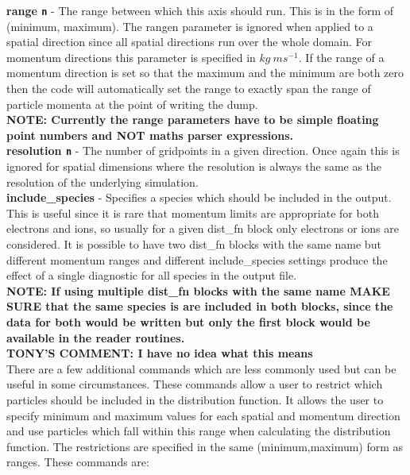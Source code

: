 \documentclass[12pt,a4paper]{article}
\newcommand{\emphtext}{\color{warwickdark} \fontfamily{phv}\selectfont\large\bf}
\newcommand{\inlinecode}[1]{{\color{warwickred} \bf\texttt{#1}}}
\newcommand{\tony}[1]{{\color{warwickred} \bf{TONY'S COMMENT:} \bf{#1}}\\}
\begin{document}
{\emphtext range\inlinecode{n}} - The range between which this axis should
run. This is in the form of (minimum, maximum). The rangen parameter is ignored
when applied to a spatial direction since all spatial directions run over
the whole domain. For momentum directions this parameter is specified in
$kg\ ms^{-1}$. If the range of a momentum direction is set so that the maximum
and the minimum are both zero then the code will automatically set the range to
exactly span the range of particle momenta at the point of writing the dump.\\

{\emphtext NOTE: Currently the range parameters have to be simple floating
point numbers and NOT maths parser expressions.}\\

{\emphtext resolution\inlinecode{n}} - The number of gridpoints in a given
direction. Once again this is ignored for spatial dimensions where the
resolution is always the same as the resolution of the underlying simulation.\\

{\emphtext include\_species} - Specifies a species which should be included
in the output. This is useful since it is rare that momentum limits are
appropriate for both electrons and ions, so usually for a given dist\_fn block
only electrons or ions are considered. It is possible to have two dist\_fn
blocks with the same name but different momentum ranges and different
include\_species settings produce the effect of a single diagnostic for
all species in the output file.\\

{\emphtext NOTE: If using multiple dist\_fn blocks with the same name MAKE SURE
that the same species is are included in both blocks, since the data for both
would be written but only the first block would be available in the reader
routines.}\\
\tony{I have no idea what this means}

There are a few additional commands which are less commonly used but can be
useful in some circumstances. These commands allow a user to restrict which
particles should be included in the distribution function.
It allows the user to specify minimum and
maximum values for each spatial and momentum direction and use particles which
fall within this range when calculating the distribution function. The
restrictions are specified in the same (minimum,maximum) form as ranges. These
commands are:\\
\end{document}
